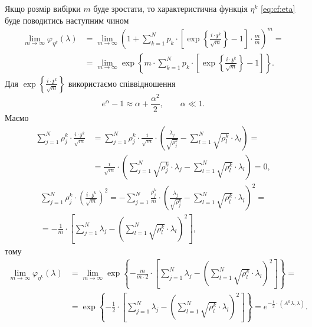 Якщо розмір вибірки $m$ буде зростати, то характеристична функція $\eta^k$
\eqref{eq:cf:eta} буде поводитись наступним чином
\begin{equation*}
  \begin{split}
    \lim_{m \to \infty} \varphi_{\eta^k}\left( \lambda \right)
    &= \lim_{m \to \infty} \left( 1 + \sum_{k=1}^{N} p_k \cdot \left[
      \exp{\left\{ \frac{i \cdot \mathfrak{z}^k}{\sqrt{m}} \right\}}
      - 1 \right] \cdot \frac{m}{m} \right)^m = \\
    &= \lim_{m \to \infty} \exp{ \left\{ m \cdot \sum_{k=1}^{N} p_k \cdot \left[
      \exp{\left\{ \frac{i \cdot \mathfrak{z}^k}{\sqrt{m}} \right\}}
      - 1 \right] \right\}}.
  \end{split}
\end{equation*}
Для $\exp{\left\{ \frac{i \cdot \mathfrak{z}^k}{\sqrt{m}} \right\}}$
використаємо співвідношення
\begin{equation*}
  e^{\alpha} - 1 \approx \alpha + \frac{\alpha^2}{2},\qquad \alpha \ll 1.
\end{equation*}
Маємо
\begin{equation*}
  \begin{split}
    \sum_{j=1}^{N} \rho_j^k \cdot \frac{i \cdot \mathfrak{z}^k}{\sqrt{m}}
    &= \sum_{j=1}^{N} \rho_j^k \cdot \frac{i}{\sqrt{m}}
      \cdot \left( \frac{\lambda_j}{\sqrt{\rho_j^k}}
        - \sum_{l=1}^{N} \sqrt{\rho_l^k} \cdot \lambda_l \right) = \\
    &= \frac{i}{\sqrt{m}} \cdot \left(
      \sum_{j=1}^{N} \sqrt{\rho_j^k} \cdot \lambda_j
      - \sum_{l=1}^{N} \sqrt{\rho_l^k} \cdot \lambda_l \right)
    = 0,
  \end{split}
\end{equation*}
\begin{equation*}
  \begin{split}
    \sum_{j=1}^{N} \rho_j^k
      \cdot \left( \frac{i \cdot \mathfrak{z}^k}{\sqrt{m}} \right)^2
      = - \sum_{j=1}^{N} \frac{\rho_j^k}{m}
        \cdot \left( \frac{\lambda_j}{\sqrt{\rho_j^k}}
          - \sum_{l=1}^{N} \sqrt{\rho_l^k} \cdot \lambda_l \right)^2 = \\
      = - \frac{1}{m} \cdot \left[ \sum_{j=1}^{N} \lambda_j
        - \left( \sum_{l=1}^{N} \sqrt{\rho_l^k} \cdot \lambda_l \right)^2
          \right],
  \end{split}
\end{equation*}
тому
\begin{equation*}
  \begin{split}
    \lim_{m \to \infty} \varphi_{\eta^k}\left( \lambda \right)
    &= \lim_{m \to \infty} \exp{\left\{ -\frac{m}{m \cdot 2}
      \cdot \left[ \sum_{j=1}^{N} \lambda_j
        - \left( \sum_{l=1}^{N} \sqrt{\rho_l^k} \cdot \lambda_l \right)^2
        \right]\right\}} = \\
    &= \exp{\left\{ -\frac{1}{2} \cdot
      \left[ \sum_{j=1}^{N} \lambda_j
        - \left( \sum_{l=1}^{N} \sqrt{\rho_l^k} \cdot \lambda_l \right)^2
        \right] \right\}}
    = e^{-\frac{1}{2} \cdot \left( A^k \lambda, \lambda \right)}.
  \end{split}
\end{equation*}
